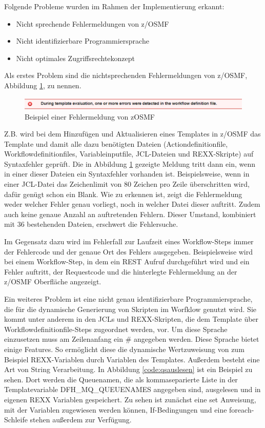 Folgende Probleme wurden im Rahmen der Implementierung erkannt:

\begin{samepage}
\begin{itemize}
\item Nicht sprechende Fehlermeldungen von z/OSMF
\item Nicht identifizierbare Programmiersprache
\item Nicht optimales Zugriffsrechtekonzept
\end{itemize}
\end{samepage}

Als erstes Problem sind die nichtsprechenden Fehlermeldungen von z/OSMF, Abbildung \ref{fig:zosmffehler}, zu nennen.
\begin{figure}[h]
	\centering
	\includegraphics[width=\textwidth]{figures/zosmffehlermeldung.png}
	\caption{Beispiel einer Fehlermeldung von zOSMF}
	\label{fig:zosmffehler}
\end{figure}
Z.B. wird bei dem Hinzufügen und Aktualisieren eines Templates in z/OSMF das Template und damit alle dazu benötigten Dateien (Actiondefinitionfile, Workflowdefinitionfiles, Variableinputfile, JCL-Dateien und REXX-Skripte) auf Syntaxfehler geprüft.
Die in Abbildung \ref{fig:zosmffehler} gezeigte Meldung tritt dann ein, wenn in einer dieser Dateien ein Syntaxfehler vorhanden ist.
Beispielsweise, wenn in einer JCL-Datei das Zeichenlimit von 80 Zeichen pro Zeile überschritten wird, dafür genügt schon ein \glqq Blank\grqq.
Wie zu erkennen ist, zeigt die Fehlermeldung weder welcher Fehler genau vorliegt, noch in welcher Datei dieser auftritt.
Zudem auch keine genaue Anzahl an auftretenden Fehlern.
Dieser Umstand, kombiniert mit 36 bestehenden Dateien, erschwert die Fehlersuche.

Im Gegensatz dazu wird im Fehlerfall zur Laufzeit eines Workflow-Steps immer der Fehlercode und der genaue Ort des Fehlers ausgegeben.
Beispielsweise wird bei einem Workflow-Step, in dem ein REST Aufruf durchgeführt wird und ein Fehler auftritt, der Requestcode und die hinterlegte Fehlermeldung an der z/OSMF Oberfläche angezeigt. 

Ein weiteres Problem ist eine nicht genau identifizierbare Programmiersprache, die für die dynamische Generierung von Skripten im Worfklow genutzt wird.
Sie kommt unter anderem in den JCLs und REXX-Skripten, die dem Template über Workflowdefinitionfile-Steps zugeordnet werden, vor.
Um diese Sprache einzusetzen muss am Zeilenanfang ein \glqq\#\grqq{} angegeben werden.
Diese Sprache bietet einige Features.
So ermöglicht diese die dynamische Wertzuweisung von zum Beispiel REXX-Variablen durch Variablen des Templates.
Außerdem besteht eine Art von String Verarbeitung.
In Abbildung \ref{code:qsauslesen} ist ein Beispiel zu sehen.
Dort werden die Queuenamen, die als kommaseparierte Liste in der Templatevariable \glqq DFH\_MQ\_QUEUENAMES\grqq{} angegeben sind, ausgelesen und in eigenen REXX Variablen gespeichert.
Zu sehen ist zunächst eine \glqq set\grqq{} Anweisung, mit der Variablen zugewiesen werden können, If-Bedingungen und eine foreach-Schleife stehen außerdem zur Verfügung.

